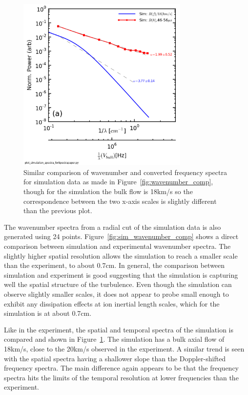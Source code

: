 \documentclass[aip,prl,amsmath,amssymb,reprint,superscriptaddress]{revtex4-1} %
\begin{document}
\begin{figure}[!htbp]
\centerline{
\includegraphics[width=8.5cm]{Simulation_spatial_temporal_spectra_comparision}}
\caption{\label{fig:sim_spatial_comp} Similar comparison of wavenumber and converted frequency spectra for simulation data as made in Figure~\ref{fig:wavenumber_comp}, though for the simulation the bulk flow is 18km/s so the correspondence between the two x-axis scales is slightly different than the previous plot.}
\end{figure}

The wavenumber spectra from a radial cut of the simulation data is also generated using 24 points. Figure~\ref{fig:sim_wavenumber_comp} shows a direct comparison between simulation and experimental wavenumber spectra. The slightly higher spatial resolution allows the simulation to reach a smaller scale than the experiment, to about 0.7cm. In general, the comparison between simulation and experiment is good suggesting that the simulation is capturing well the spatial structure of the turbulence. Even though the simulation can observe slightly smaller scales, it does not appear to probe small enough to exhibit any dissipation effects at ion inertial length scales, which for the simulation is at about 0.7cm.

Like in the experiment, the spatial and temporal spectra of the simulation is compared and shown in Figure~\ref{fig:sim_spatial_comp}. The simulation has a bulk axial flow of 18km/s, close to the 20km/s observed in the experiment. A similar trend is seen with the spatial spectra having a shallower slope than the Doppler-shifted frequency spectra. The main difference again appears to be that the frequency spectra hits the limits of the temporal resolution at lower frequencies than the experiment.
\end{document}
